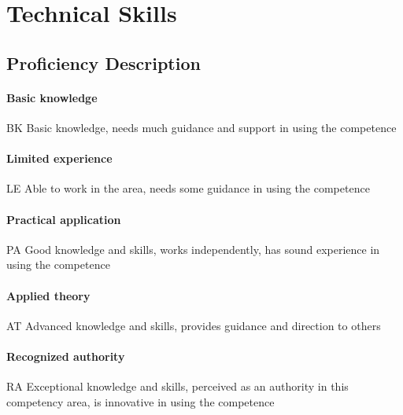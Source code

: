 \documentclass[10pt]{article} %
\begin{document}
\section{Technical Skills}
\subsection{Proficiency Description}
\paragraph{Basic knowledge} BK Basic knowledge, needs much guidance and support in using
the competence
\paragraph{Limited experience} LE Able to work in the area, needs some guidance in using the
competence
\paragraph{Practical application} PA Good knowledge and skills, works independently, has
sound experience in using the competence
\paragraph{Applied theory} AT Advanced knowledge and skills, provides guidance and direction
to others
\paragraph{Recognized authority} RA Exceptional knowledge and skills, perceived as an
authority in this competency area, is innovative in using the competence
\end{document}
